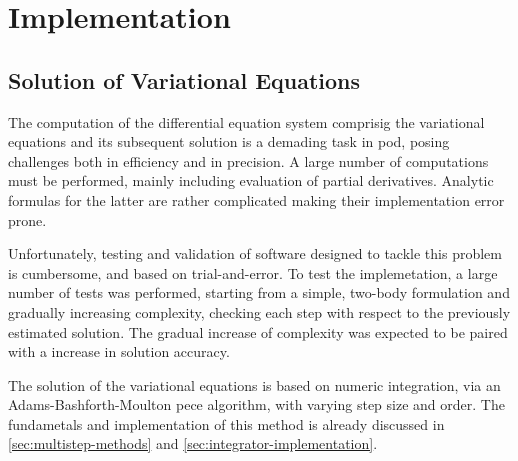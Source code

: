\section{Implementation}\label{sec:pod-implementation}

\subsection{Solution of Variational Equations}\label{ssec:vareq-implementation}
The computation of the differential equation system comprisig the variational 
equations and its subsequent solution is a demading task in \gls{pod}, posing 
challenges both in efficiency and in precision. A large number of computations 
must be performed, mainly including evaluation of partial derivatives. Analytic 
formulas for the latter are rather complicated making their implementation error 
prone.

Unfortunately, testing and validation of software designed to tackle this problem 
is cumbersome, and based on trial-and-error. To test the implemetation, a large 
number of tests was performed, starting from a simple, two-body formulation and 
gradually increasing complexity, checking each step with respect to the previously 
estimated solution. The gradual increase of complexity was expected to be paired with 
a increase in solution accuracy.

The solution of the variational equations is based on numeric integration, via an 
Adams-Bashforth-Moulton \gls{pece} algorithm, with varying step size and order. The 
fundametals and implementation of this method is already discussed in \autoref{sec:multistep-methods} 
and \autoref{sec:integrator-implementation}.

